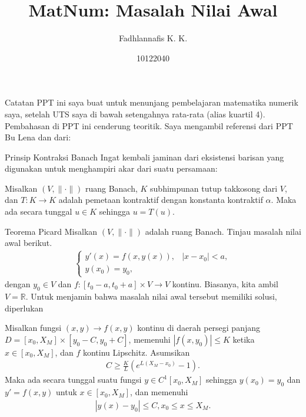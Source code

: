 \documentclass[xcolor={dvipsnames}, 9pt]{beamer}
\title{MatNum: Masalah Nilai Awal}
\author{Fadhlannafis K. K.}
\date{10122040}
\begin{document}
	\begin{frame}[plain]
		\maketitle
	\end{frame}
	\begin{frame}{Catatan}
		PPT ini saya buat untuk menunjang pembelajaran matematika numerik saya, setelah UTS saya di bawah setengahnya rata-rata (alias kuartil 4). \newline
		Pembahasan di PPT ini cenderung teoritik. Saya mengambil referensi dari PPT Bu Lena dan dari:
		\nocite{*}
		\printbibliography
    \end{frame}
    \begin{frame}{Prinsip Kontraksi Banach}
        Ingat kembali jaminan dari eksistensi barisan yang digunakan untuk menghampiri akar dari suatu persamaan:
        \begin{theorem}
            Misalkan $(V,\|\cdot\|)$ ruang Banach, $K$ subhimpunan tutup takkosong dari $V$, dan $T:K\to K$ adalah pemetaan kontraktif dengan konstanta kontraktif $\alpha$. Maka ada secara tunggal $u\in K$ sehingga $u=T(u)$. 
        \end{theorem}
    \end{frame}
    \begin{frame}{Teorema Picard}
        Misalkan $(V,\|\cdot\|)$ adalah ruang Banach. Tinjau masalah nilai awal berikut.
        \begin{align}\label{ivp}
            \begin{cases}
                y'(x) = f(x,y(x)), & |x-x_0| < a, \\
                y(x_0) = y_0,
            \end{cases}
        \end{align}
        dengan $y_0\in V$ dan $f:[t_0-a,t_0+a]\times V\to V$ kontinu. Biasanya, kita ambil $V=\mathbb{R}$. Untuk menjamin bahwa masalah nilai awal tersebut memiliki solusi, diperlukan
        \begin{theorem}[Picard]
            Misalkan fungsi $(x,y)\to f(x,y)$ kontinu di daerah persegi panjang $D = [x_0,X_M] \times [y_0-C, y_0+C]$, memenuhi $|f(x,y_0)|\leq K$ ketika $x\in[x_0,X_M]$, dan $f$ kontinu Lipschitz. Asumsikan
            \begin{align*}
                C\geq \frac{K}{L}\left(e^{L(X_M-x_0)}-1\right).
            \end{align*}
            Maka ada secara tunggal suatu fungsi $y\in C^1[x_0,X_M]$ sehingga $y(x_0)=y_0$ dan $y'=f(x,y)$ untuk $x\in [x_0, X_M]$, dan memenuhi
            \begin{align*}
                |y(x)-y_0|\leq C, x_0\leq x\leq X_M.
            \end{align*}
        \end{theorem}
    \end{frame}
\end{document}
